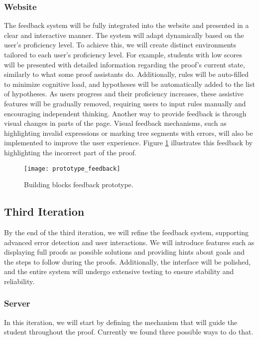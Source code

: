 \subsubsection{Website}
The feedback system will be fully integrated into the website and presented in a clear and interactive manner. The system will adapt dynamically based on the user's proficiency level. To achieve this, we will create distinct environments tailored to each user's proficiency level. For example, students with low scores will be presented with detailed information regarding the proof's current state, similarly to what some proof assistants do. Additionally, rules will be auto-filled to minimize cognitive load, and hypotheses will be automatically added to the list of hypotheses. As users progress and their proficiency increases, these assistive features will be gradually removed, requiring users to input rules manually and encouraging independent thinking. 
Another way to provide feedback is through visual changes in parts of the page. Visual feedback mechanisms, such as highlighting invalid expressions or marking tree segments with errors, will also be implemented to improve the user experience. Figure \ref{img:building-blocks-feedback} illustrates this feedback by highlighting the incorrect part of the proof.

\begin{figure}[htbp]
    \centering
    \texttt{[image: prototype\_feedback]}
    \caption{Building blocks feedback prototype.}
    \label{img:building-blocks-feedback}
\end{figure}

\subsection{Third Iteration}
By the end of the third iteration, we will refine the feedback system, supporting advanced error detection and user interactions. We will introduce features such as displaying full proofs as possible solutions and providing hints about goals and the steps to follow during the proofs. Additionally, the interface will be polished, and the entire system will undergo extensive testing to ensure stability and reliability.

\subsubsection{Server}
In this iteration, we will start by defining the mechanism that will guide the student throughout the proof. Currently we found three possible ways to do that.

